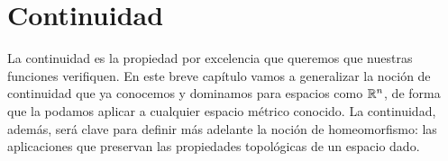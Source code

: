 \chapter{Continuidad}
\label{cont}

La continuidad es la propiedad por excelencia que queremos que nuestras funciones verifiquen. En este breve capítulo vamos a generalizar la noción de continuidad que ya conocemos y dominamos para espacios como $\mathbb{R}^n$, de forma que la podamos aplicar a cualquier espacio métrico conocido. La continuidad, además, será clave para definir más adelante la noción de homeomorfismo: las aplicaciones que preservan las propiedades topológicas de un espacio dado.

